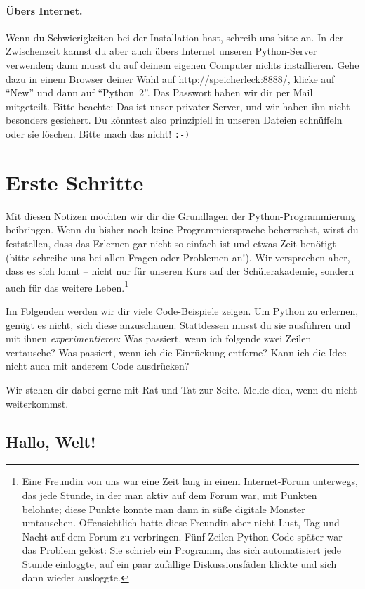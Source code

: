 \documentclass{blatt}
\begin{document}
\paragraph{Übers Internet.} Wenn du Schwierigkeiten bei der Installation hast,
schreib uns bitte an. In der Zwischenzeit kannst du aber auch übers Internet
unseren Python-Server verwenden; dann musst du auf deinem eigenen Computer
nichts installieren. Gehe dazu in einem Browser deiner Wahl auf
\url{http://speicherleck:8888/}, klicke auf "`New"' und dann auf
"`Python~2"'. Das Passwort haben wir dir per Mail mitgeteilt. Bitte
beachte: Das ist unser privater Server, und wir haben ihn nicht besonders
gesichert. Du könntest also prinzipiell in unseren Dateien schnüffeln oder sie
löschen. Bitte mach das nicht! \texttt{:-)}


\section{Erste Schritte}

Mit diesen Notizen möchten wir dir die Grundlagen der Python-Programmierung
beibringen. Wenn du bisher noch keine Programmiersprache beherrschst, wirst du
feststellen, dass das Erlernen gar nicht so einfach ist und etwas
Zeit benötigt (bitte schreibe uns bei allen Fragen oder Problemen an!). Wir
versprechen aber, dass es sich lohnt -- nicht nur für unseren Kurs auf der
Schülerakademie, sondern auch für das weitere Leben.\footnote{Eine Freundin von
uns war eine Zeit lang in einem Internet-Forum unterwegs, das jede Stunde, in
der man aktiv auf dem Forum war, mit Punkten belohnte; diese Punkte konnte man
dann in süße digitale Monster umtauschen. Offensichtlich hatte diese Freundin
aber nicht Lust, Tag und Nacht auf dem Forum zu verbringen. Fünf Zeilen
Python-Code später war das Problem gelöst: Sie schrieb ein Programm,
das sich automatisiert jede Stunde einloggte, auf ein paar zufällige
Diskussionsfäden klickte und sich dann wieder ausloggte.}

Im Folgenden werden wir dir viele Code-Beispiele zeigen. Um Python zu erlernen,
genügt es nicht, sich diese anzuschauen. Stattdessen musst du sie ausführen und
mit ihnen \emph{experimentieren}: Was passiert, wenn ich folgende zwei Zeilen
vertausche? Was passiert, wenn ich die Einrückung entferne? Kann ich die Idee
nicht auch mit anderem Code ausdrücken?

Wir stehen dir dabei gerne mit Rat und Tat zur Seite. Melde dich, wenn du nicht
weiterkommst.


\subsection{Hallo, Welt!}
\end{document}
